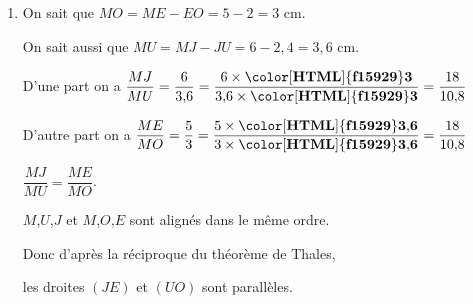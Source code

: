 \begin{corrige}
\begin{enumerate}
\begin{spacing}{1.5}
            \end{spacing}
        \item \begin{spacing}{1.5}
            \begin{minipage}{0.3\linewidth}
            \end{minipage}
            \hfill
            \begin{minipage}{.65\linewidth} 
                On sait que $MO=ME-EO=5-2=3$ cm.

                On sait aussi que $MU=MJ-JU=6-2{,}4=3{,}6$ cm.

                D'une part on a $\dfrac{MJ}{MU}=\dfrac{6}{3{,}6}=\dfrac{6\times\mathbf{{\color[HTML]{f15929}3}}}{3{,}6\times\mathbf{{\color[HTML]{f15929}3}}}=\dfrac{18}{10{,}8}$

                D'autre part on a $\dfrac{ME}{MO}=\dfrac{5}{3}=\dfrac{5\times\mathbf{{\color[HTML]{f15929}3{,}6}}}{3\times\mathbf{{\color[HTML]{f15929}3{,}6}}}=\dfrac{18}{10{,}8}$

                $\dfrac{MJ}{MU}=\dfrac{ME}{MO}$.

                $M$,$U$,$J$ et $M$,$O$,$E$ sont alignés dans le même ordre.

                Donc d'après la réciproque du théorème de Thales,
                
                les droites $(JE)$ et $(UO)$ sont parallèles.
                
            \end{minipage} 
            \end{spacing}
    \end{enumerate}
\end{corrige}

